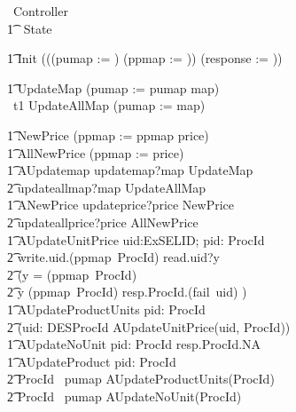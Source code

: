 \begin{circus}
	\circprocess\ Controller \circdef \circbegin \\
    	\t1 \circstate\ State \defs [~ pumap: ESELIDProcId; ppmap: ProcIdPrice; \\
            \t2 response: PIPFS ~]

			\t1	Init \circdef (((pumap := \emptyset) \circseq (ppmap := \emptyset)) \circseq (response := \emptyset ))

			\t1 UpdateMap \circdef (pumap := pumap \oplus map)\\
      \
			t1 UpdateAllMap \circdef   (pumap := map)

			\t1 NewPrice \circdef (ppmap := ppmap \oplus price) \\

			\t1 AllNewPrice \circdef (ppmap := price)\\

			\t1 AUpdatemap \circdef updatemap?map \then  UpdateMap \\
          \t2 \extchoice updateallmap?map \then  UpdateAllMap \\

			\t1 ANewPrice \circdef updateprice?price \then  NewPrice \\
          \t2 \extchoice updateallprice?price \then  AllNewPrice \\
        \t1 AUpdateUnitPrice \circdef uid:ExSELID; pid: ProcId \circspot \\
            \t2 write.uid.(ppmap~ProcId) \then read.uid?y \then \\
            \t2 (\lcircguard y = (ppmap~ProcId) \rcircguard \circguard \Skip \\
            \t2 \extchoice \lcircguard y \neq (ppmap~ProcId) \rcircguard \circguard resp.ProcId.(fail~uid) \then \Skip) \\
        \t1 AUpdateProductUnits \circdef pid: ProcId \circspot \\
            \t2 (\Interleave uid: DESProcId \circspot AUpdateUnitPrice(uid, ProcId)) \\

				\t1 AUpdateNoUnit \circdef  pid: ProcId \circspot resp.ProcId.NA \then \Skip \\

				\t1 AUpdateProduct \circdef pid: ProcId \circspot \\
            \t2  \lcircguard ProcId \in \ran~pumap \rcircguard \circguard AUpdateProductUnits(ProcId) \\
            \t2 \extchoice \lcircguard ProcId \notin \ran~pumap \rcircguard \circguard AUpdateNoUnit(ProcId) \\


\end{circus}
